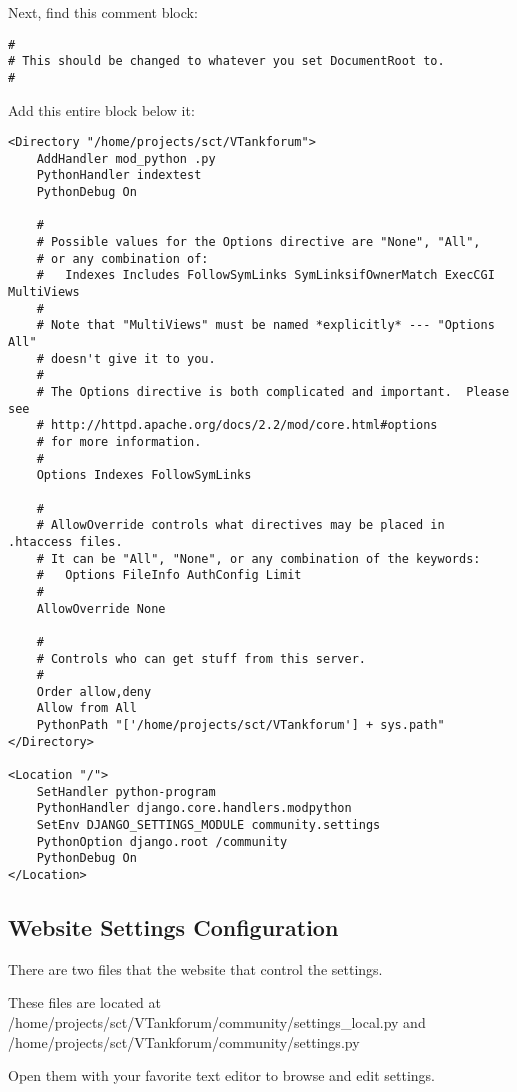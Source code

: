 \vspace{1pc}

Next, find this comment block:

\begin{verbatim}
#
# This should be changed to whatever you set DocumentRoot to.
#
\end{verbatim}

Add this entire block below it:

\begin{verbatim}
<Directory "/home/projects/sct/VTankforum">
    AddHandler mod_python .py
    PythonHandler indextest
    PythonDebug On

    #
    # Possible values for the Options directive are "None", "All",
    # or any combination of:
    #   Indexes Includes FollowSymLinks SymLinksifOwnerMatch ExecCGI MultiViews
    #
    # Note that "MultiViews" must be named *explicitly* --- "Options All"
    # doesn't give it to you.
    #
    # The Options directive is both complicated and important.  Please see
    # http://httpd.apache.org/docs/2.2/mod/core.html#options
    # for more information.
    #
    Options Indexes FollowSymLinks

    #
    # AllowOverride controls what directives may be placed in .htaccess files.
    # It can be "All", "None", or any combination of the keywords:
    #   Options FileInfo AuthConfig Limit
    #
    AllowOverride None

    #
    # Controls who can get stuff from this server.
    #
    Order allow,deny
    Allow from All
    PythonPath "['/home/projects/sct/VTankforum'] + sys.path"
</Directory>

<Location "/">
    SetHandler python-program
    PythonHandler django.core.handlers.modpython
    SetEnv DJANGO_SETTINGS_MODULE community.settings
    PythonOption django.root /community
    PythonDebug On
</Location>
\end{verbatim}

\subsection{Website Settings Configuration}
There are two files that the website that control the settings.  

These files are located at /home/projects/sct/VTankforum/community/settings\_local.py and /home/projects/sct/VTankforum/community/settings.py

Open them with your favorite text editor to browse and edit settings.

